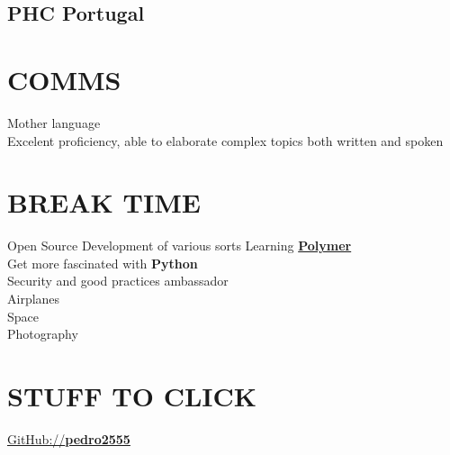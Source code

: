 \documentclass[letterpaper]{deedy-resume} %
\begin{document}
\begin{minipage}[t]{0.33\textwidth}
\subsection{PHC Portugal}

\sectionspace

\section{COMMS}
Mother language\\
Excelent proficiency, able to elaborate complex topics both written and spoken\\

\section{BREAK TIME}
Open Source Development of various sorts
Learning \textbf{\href{https://www.polymer-project.org/}{Polymer}}\\
Get more fascinated with \textbf{Python}\\
Security and good practices ambassador\\
Airplanes\\
Space\\
Photography\\

\section{STUFF TO CLICK}
\href{https://github.com/pedro2555}{GitHub://\textbf{pedro2555}}\\

\end{minipage}
\hfill
%
%
\end{document}
